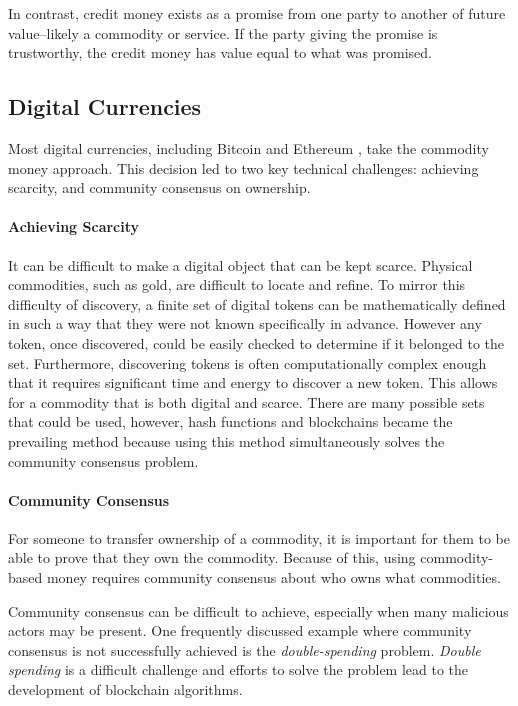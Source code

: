 \documentclass[runningheads]{llncs}
\begin{document}
In contrast, credit money exists as a promise from one party to another of future value--likely a commodity or service. If the party giving the promise is trustworthy, the credit money has value equal to what was promised.

\subsection{Digital Currencies}
Most digital currencies, including Bitcoin and Ethereum \cite{bitcoin}, take the commodity money approach. This decision led to two key technical challenges: achieving scarcity, and community consensus on ownership.

\paragraph{Achieving Scarcity}
It can be difficult to make a digital object that can be kept scarce.
Physical commodities, such as gold, are difficult to locate and refine. To mirror this difficulty of discovery, a finite set of digital tokens can be mathematically defined in such a way that they were not known specifically in advance. However any token, once discovered, could be easily checked to determine if it belonged to the set. Furthermore, discovering tokens is often computationally complex enough that it requires significant time and energy to discover a new token. This allows for a commodity that is both digital and scarce.
There are many possible sets that could be used, however, hash functions and blockchains became the prevailing method because using this method simultaneously solves the community consensus problem.

\paragraph{Community Consensus}
For someone to transfer ownership of a commodity, it is important for them to be able to prove that they own the commodity. Because of this, using commodity-based money requires community consensus about who owns what commodities.

Community consensus can be difficult to achieve, especially when many malicious actors may be present. One frequently discussed example where community consensus is not successfully achieved is the \emph{double-spending} problem. \emph{Double spending} is a difficult challenge and efforts to solve the problem lead to the development of blockchain algorithms. 
\end{document}
